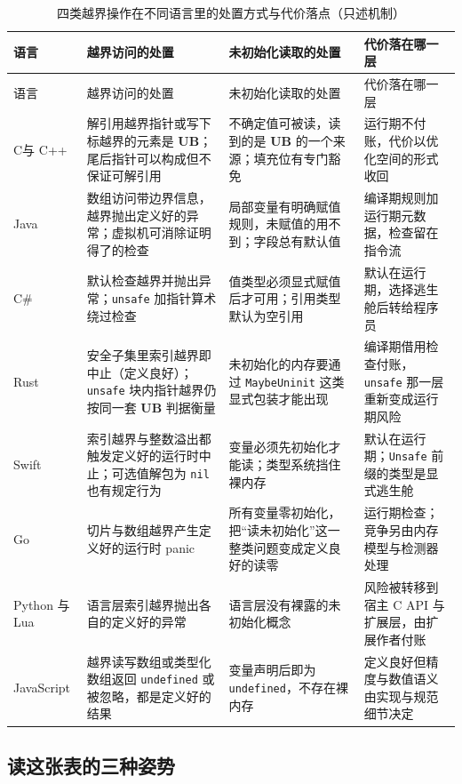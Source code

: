 \documentclass[12pt,a4paper,fontset=fandol]{ctexbook}
\newcommand{\Tp}[1]{\texttt{#1}}
\newcommand{\Lang}[1]{\textsf{#1}}
\newcommand{\CL}{\Lang{C}}
\newcommand{\CPP}{\Lang{C++}}
\newcommand{\UB}{\textbf{\textsf{UB}}}
\begin{document}
\begin{longtable}{@{}>{\raggedright\arraybackslash}p{} >{\raggedright\arraybackslash}p{} >{\raggedright\arraybackslash}p{} >{\raggedright\arraybackslash}p{}@{}}
\caption{四类越界操作在不同语言里的处置方式与代价落点（只述机制）}\label{tab:ub02-cost}\\
\toprule
语言 & 越界访问的处置 & 未初始化读取的处置 & 代价落在哪一层 \\
\midrule
\endfirsthead
\toprule
语言 & 越界访问的处置 & 未初始化读取的处置 & 代价落在哪一层 \\
\midrule
\endhead
\bottomrule
\endfoot
\CL 与 \CPP & 解引用越界指针或写下标越界的元素是 \UB{}；尾后指针可以构成但不保证可解引用 & 不确定值可被读，读到的是 \UB{} 的一个来源；填充位有专门豁免 & 运行期不付账，代价以优化空间的形式收回 \\
\Lang{Java} & 数组访问带边界信息，越界抛出定义好的异常；虚拟机可消除证明得了的检查 & 局部变量有明确赋值规则，未赋值的用不到；字段总有默认值 & 编译期规则加运行期元数据，检查留在指令流 \\
\Lang{C\#} & 默认检查越界并抛出异常；\Tp{unsafe} 加指针算术绕过检查 & 值类型必须显式赋值后才可用；引用类型默认为空引用 & 默认在运行期，选择逃生舱后转给程序员 \\
\Lang{Rust} & 安全子集里索引越界即中止（定义良好）；\Tp{unsafe} 块内指针越界仍按同一套 \UB{} 判据衡量 & 未初始化的内存要通过 \Tp{MaybeUninit} 这类显式包装才能出现 & 编译期借用检查付账，\Tp{unsafe} 那一层重新变成运行期风险 \\
\Lang{Swift} & 索引越界与整数溢出都触发定义好的运行时中止；可选值解包为 \Tp{nil} 也有规定行为 & 变量必须先初始化才能读；类型系统挡住裸内存 & 默认在运行期；\Tp{Unsafe} 前缀的类型是显式逃生舱 \\
\Lang{Go} & 切片与数组越界产生定义好的运行时 panic & 所有变量零初始化，把“读未初始化”这一整类问题变成定义良好的读零 & 运行期检查；竞争另由内存模型与检测器处理 \\
\Lang{Python} 与 \Lang{Lua} & 语言层索引越界抛出各自的定义好的异常 & 语言层没有裸露的未初始化概念 & 风险被转移到宿主 C API 与扩展层，由扩展作者付账 \\
\Lang{JavaScript} & 越界读写数组或类型化数组返回 \Tp{undefined} 或被忽略，都是定义好的结果 & 变量声明后即为 \Tp{undefined}，不存在裸内存 & 定义良好但精度与数值语义由实现与规范细节决定 \\
\end{longtable}

\subsection{读这张表的三种姿势}\label{sec:ub02-cost-read}
\end{document}
